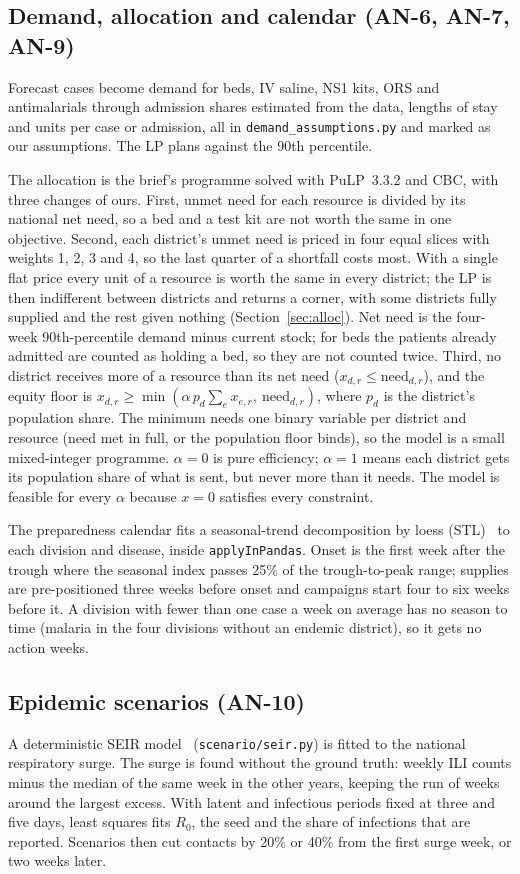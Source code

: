 \subsection{Demand, allocation and calendar (AN-6, AN-7, AN-9)}
Forecast cases become demand for beds, IV saline, NS1 kits, ORS and antimalarials through admission shares
estimated from the data, lengths of stay and units per case or admission, all in
\texttt{demand\_assumptions.py} and marked as our assumptions. The LP plans against the 90th percentile.

The allocation is the brief's programme solved with PuLP~3.3.2 and CBC, with three changes of ours. First, unmet need
for each resource is divided by its national net need, so a bed and a test kit are not worth the same in one
objective. Second, each district's unmet need is priced in four equal slices with weights 1, 2, 3 and 4, so the
last quarter of a shortfall costs most. With a single flat price every unit of a resource is worth the same in
every district; the LP is then indifferent between districts and returns a corner, with some districts fully
supplied and the rest given nothing (Section~\ref{sec:alloc}). Net need is the four-week 90th-percentile demand minus current
stock; for beds the patients already admitted are counted as holding a bed, so they are not counted twice. Third, no
district receives more of a resource than its net need ($x_{d,r}\le \text{need}_{d,r}$), and the equity floor is
$x_{d,r}\ge\min(\alpha\,p_d\sum_e x_{e,r},\ \text{need}_{d,r})$, where $p_d$ is the district's population
share. The minimum needs one binary variable per district and resource (need met in full, or the population
floor binds), so the model is a small mixed-integer programme. $\alpha=0$ is pure efficiency; $\alpha=1$ means
each district gets its population share of what is sent, but never more than it needs. The model is feasible
for every $\alpha$ because $x=0$ satisfies every constraint.

The preparedness calendar fits a seasonal-trend decomposition by loess (STL)~\cite{cleveland1990stl} to each division and disease, inside \texttt{applyInPandas}. Onset is the first week
after the trough where the seasonal index passes 25\% of the trough-to-peak range; supplies are pre-positioned
three weeks before onset and campaigns start four to six weeks before it. A division with fewer than one case a
week on average has no season to time (malaria in the four divisions without an endemic district), so it gets
no action weeks.

\subsection{Epidemic scenarios (AN-10)}
A deterministic SEIR model~\cite{kermack1927} (\texttt{scenario/seir.py}) is fitted to the national
respiratory surge. The surge is found without the ground truth: weekly ILI counts minus the median of the same
week in the other years, keeping the run of weeks around the largest excess. With latent and infectious
periods fixed at three and five days, least squares fits $R_0$, the seed and the share of infections that are
reported. Scenarios then cut contacts by 20\% or 40\% from the first surge week, or two weeks later.
